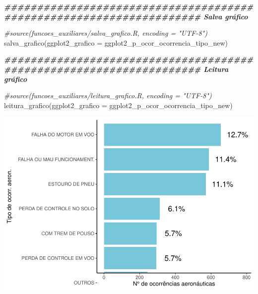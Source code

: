 \documentclass[
]{article}
\newenvironment{Shaded}{\begin{snugshade}}{\end{snugshade}}
\newcommand{\AttributeTok}[1]{\textcolor[rgb]{0.77,0.63,0.00}{#1}}
\newcommand{\CommentTok}[1]{\textcolor[rgb]{0.56,0.35,0.01}{\textit{#1}}}
\newcommand{\DocumentationTok}[1]{\textcolor[rgb]{0.56,0.35,0.01}{\textbf{\textit{#1}}}}
\newcommand{\FunctionTok}[1]{\textcolor[rgb]{0.00,0.00,0.00}{#1}}
\newcommand{\NormalTok}[1]{#1}
\begin{document}
\begin{Shaded}
\begin{Highlighting}[]
\DocumentationTok{\#\#\#\#\#\#\#\#\#\#\#\#\#\#\#\#\#\#\#\#\#\#\#\#\#\#\#\#\#\#\#\#\#\#\#\#\#\#\#\#\#\#\#\#\#\#\#\#\#\#\#\#\#\#\#\#\#\#\#\#\#\#\#\#\#\#\#\# Salva gráfico}

\CommentTok{\#source(\textquotesingle{}funcoes\_auxiliares/salva\_grafico.R\textquotesingle{}, encoding = "UTF{-}8")}
\FunctionTok{salva\_grafico}\NormalTok{(}\AttributeTok{ggplot2\_grafico =}\NormalTok{ ggplot2\_p\_ocor\_ocorrencia\_tipo\_new)}

\DocumentationTok{\#\#\#\#\#\#\#\#\#\#\#\#\#\#\#\#\#\#\#\#\#\#\#\#\#\#\#\#\#\#\#\#\#\#\#\#\#\#\#\#\#\#\#\#\#\#\#\#\#\#\#\#\#\#\#\#\#\#\#\#\#\#\#\#\#\#\#\# Leitura gráfico}

\CommentTok{\#source(\textquotesingle{}funcoes\_auxiliares/leitura\_grafico.R\textquotesingle{}, encoding = "UTF{-}8")}
\FunctionTok{leitura\_grafico}\NormalTok{(}\AttributeTok{ggplot2\_grafico =}\NormalTok{ ggplot2\_p\_ocor\_ocorrencia\_tipo\_new)}
\end{Highlighting}
\end{Shaded}

\begin{center}\includegraphics[width=1\linewidth]{../4.Relatorio/pdf/index_files/figure-latex/unnamed-chunk-45-1} \end{center}
\end{document}

